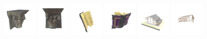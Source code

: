 \begin{figure}[htbp]
  \includegraphics[width=0.15\textwidth]{images/data/samples/4.1.jpeg}\hspace{0.01\textwidth}%
  \includegraphics[width=0.15\textwidth]{images/data/samples/4.2.jpeg}\hfill
  \includegraphics[width=0.15\textwidth]{images/data/samples/5.1.jpeg}\hspace{0.01\textwidth}%
  \includegraphics[width=0.15\textwidth]{images/data/samples/5.2.jpeg}\hfill
  \includegraphics[width=0.15\textwidth]{images/data/samples/6.1.jpeg}\hspace{0.01\textwidth}%
  \includegraphics[width=0.15\textwidth]{images/data/samples/6.2.jpeg}\\\\
  \vspace{2mm}


\end{figure}
